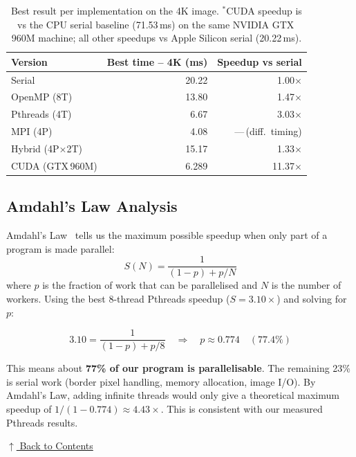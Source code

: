 \documentclass[12pt,a4paper]{article}
\begin{document}
\begin{table}[H]
\centering
\begin{tabular}{@{}lrr@{}}
\toprule
\textbf{Version} & \textbf{Best time -- 4K (ms)} & \textbf{Speedup vs serial} \\
\midrule
Serial         & 20.22 & 1.00$\times$ \\
OpenMP (8T)    & 13.80 & 1.47$\times$ \\
Pthreads (4T)  & 6.67  & 3.03$\times$ \\
MPI (4P)       & 4.08  & ---\,(diff.\ timing) \\
Hybrid (4P$\times$2T) & 15.17 & 1.33$\times$ \\
CUDA (GTX\,960M) & 6.289 & 11.37$\times$\rlap{$^{*}$} \\
\bottomrule
\end{tabular}
\caption{Best result per implementation on the 4K image.
  $^{*}$CUDA speedup is vs the CPU serial baseline (71.53\,ms) on the
  same NVIDIA GTX\,960M machine; all other speedups vs Apple Silicon serial (20.22\,ms).}
\label{tab:bestspeedup}
\end{table}

\newpage
\subsection{Amdahl's Law Analysis}
\label{subsec:amdahl}

Amdahl's Law~\cite{amdahl1967validity} tells us the maximum possible speedup
when only part of a program is made parallel:
\begin{equation}
S(N) = \frac{1}{(1-p) + p/N}
\label{eq:amdahl}
\end{equation}
where $p$ is the fraction of work that can be parallelised and $N$ is the
number of workers. Using the best 8-thread Pthreads speedup
($S = 3.10\times$) and solving for $p$:

\[
3.10 = \frac{1}{(1-p) + p/8}
\quad\Rightarrow\quad p \approx 0.774 \quad (77.4\%)
\]

This means about \textbf{77\% of our program is parallelisable}. The
remaining 23\% is serial work (border pixel handling, memory allocation, image
I/O). By Amdahl's Law, adding infinite threads would only give a theoretical
maximum speedup of $1/(1-0.774) \approx 4.43{\times}$. This is consistent
with our measured Pthreads results.

\hyperref[contents]{\small $\uparrow$ Back to Contents}

\clearpage
\end{document}
